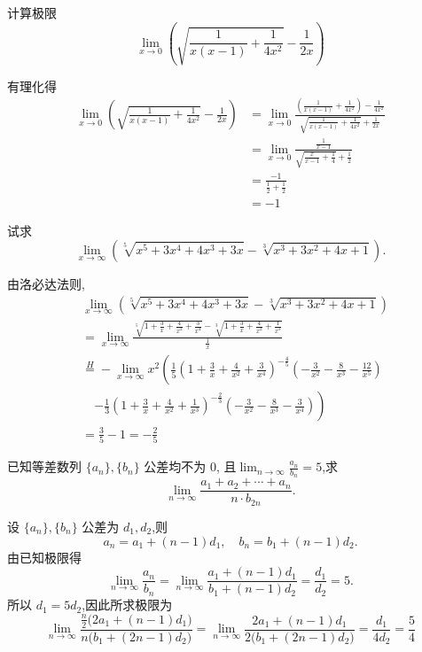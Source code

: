 \begin{questions}
    \question 计算极限 
    \[
    \lim_{x \to 0} \left( \sqrt{\frac{1}{x(x-1)} + \frac{1}{4x^2}} - \frac{1}{2x} \right)
    \]
    \begin{solution}
        有理化得
        \begin{align*}
        \lim_{x \to 0} \left( \sqrt{\frac{1}{x(x-1)} + \frac{1}{4x^2}} - \frac{1}{2x} \right) 
        &= \lim_{x \to 0} \frac{\left( \frac{1}{x(x-1)} + \frac{1}{4x^2} \right) - \frac{1}{4x^2}}{\sqrt{\frac{1}{x(x-1)} + \frac{1}{4x^2}} + \frac{1}{2x}} \\
        &= \lim_{x \to 0} \frac{\frac{1}{x-1}}{\sqrt{\frac{x}{x-1} + \frac{1}{4}} + \frac{1}{2}} \\
        &= \frac{-1}{\frac{1}{2} + \frac{1}{2}} \\
        &= -1
        \end{align*}
    \end{solution}

    \question 试求
    \[
    \lim_{x\to\infty}\left(\sqrt[5]{x^{5}+3x^{4}+4x^{3}+3x}-\sqrt[3]{x^{3}+3x^{2}+4x+1}\right).
    \]
    \begin{solution}
        由洛必达法则,
        \begin{align*}
        &\lim_{x\to \infty} \left(\sqrt[5]{x^5+3x^4+4x^3+3x} - \sqrt[3]{x^3+3x^2+4x+1} \right) \\
        &= \lim_{x\to \infty} \frac{\sqrt[5]{1 + \frac{3}{x} + \frac{4}{x^2} + \frac{3}{x^4}} - \sqrt[3]{1 + \frac{3}{x} + \frac{4}{x^2} + \frac{1}{x^3}}}{\frac{1}{x}} \\
        &\overset{H}{=} -\lim_{x\to \infty} x^2\left(
        \frac{1}{5} \left(1 + \frac{3}{x} + \frac{4}{x^2} + \frac{3}{x^4}\right)^{-\frac{4}{5}} \left(-\frac{3}{x^2} - \frac{8}{x^3} - \frac{12}{x^5}\right) \right. \\
        & \quad \left. - \frac{1}{3} \left(1 + \frac{3}{x} + \frac{4}{x^2} + \frac{1}{x^3}\right)^{-\frac{2}{3}} \left(-\frac{3}{x^2} - \frac{8}{x^3} - \frac{3}{x^4}\right) 
        \right)\\
        &= \frac{3}{5} - 1 = -\frac{2}{5}
        \end{align*}
    \end{solution}

    \question 已知等差数列 $\{a_n\},\{b_n\}$ 公差均不为 $0$, 且$\displaystyle \lim_{n\to\infty}\frac{a_n}{b_n}=5$,求
    \[
    \lim_{n\to\infty}\frac{a_1+a_2+\cdots+a_n}{n\cdot b_{2n}}.
    \]
    \begin{solution}
        设 $\{a_n\},\{b_n\}$ 公差为 $d_1,d_2$,则
        \[
        a_n=a_1+(n-1)d_1,\quad b_n=b_1+(n-1)d_2.
        \]
        由已知极限得
        \[
        \lim_{n\to\infty}\frac{a_n}{b_n}=\lim_{n\to\infty}\frac{a_1+(n-1)d_1}{b_1+(n-1)d_2}=\frac{d_1}{d_2}=5.
        \]
        所以 $d_1=5d_2$,因此所求极限为
        \[
        \lim_{n\to\infty}\frac{\frac{n}{2}\bigl(2a_1+(n-1)d_1\bigr)}{n\bigl(b_1+(2n-1)d_2\bigr)}
        = \lim_{n\to\infty}\frac{2a_1+(n-1)d_1}{2\bigl(b_1+(2n-1)d_2\bigr)}=\frac{d_1}{4d_2}=\frac{5}{4}
        \]
    \end{solution}


\end{questions}
